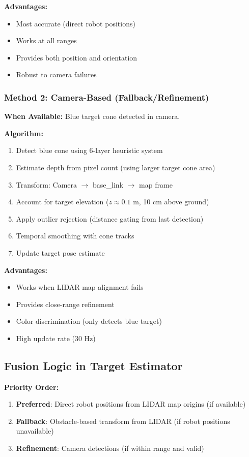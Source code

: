 \documentclass[11pt]{article}
\begin{document}
\textbf{Advantages:}
\begin{itemize}
    \item Most accurate (direct robot positions)
    \item Works at all ranges
    \item Provides both position and orientation
    \item Robust to camera failures
\end{itemize}

\subsubsection{Method 2: Camera-Based (Fallback/Refinement)}

\textbf{When Available:} Blue target cone detected in camera.

\textbf{Algorithm:}
\begin{enumerate}
    \item Detect blue cone using 6-layer heuristic system
    \item Estimate depth from pixel count (using larger target cone area)
    \item Transform: Camera $\rightarrow$ base\_link $\rightarrow$ map frame
    \item Account for target elevation ($z \approx 0.1$ m, 10 cm above ground)
    \item Apply outlier rejection (distance gating from last detection)
    \item Temporal smoothing with cone tracks
    \item Update target pose estimate
\end{enumerate}

\textbf{Advantages:}
\begin{itemize}
    \item Works when LIDAR map alignment fails
    \item Provides close-range refinement
    \item Color discrimination (only detects blue target)
    \item High update rate (30 Hz)
\end{itemize}

\subsection{Fusion Logic in Target Estimator}

\textbf{Priority Order:}
\begin{enumerate}
    \item \textbf{Preferred}: Direct robot positions from LIDAR map origins (if available)
    \item \textbf{Fallback}: Obstacle-based transform from LIDAR (if robot positions unavailable)
    \item \textbf{Refinement}: Camera detections (if within range and valid)
\end{enumerate}
\end{document}
